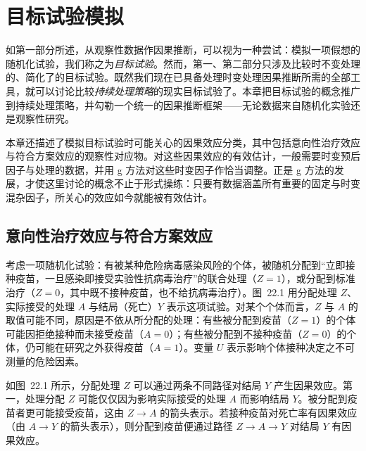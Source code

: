 \chapter{目标试验模拟}

如第一部分所述，从观察性数据作因果推断，可以视为一种尝试：模拟一项假想的随机化试验，我们称之为\emph{目标试验}。然而，第一、第二部分只涉及比较时不变处理的、简化了的目标试验。既然我们现在已具备处理时变处理因果推断所需的全部工具，就可以讨论比较\emph{持续处理策略}的现实目标试验了。本章把目标试验的概念推广到持续处理策略，并勾勒一个统一的因果推断框架——无论数据来自随机化实验还是观察性研究。

本章还描述了模拟目标试验时可能关心的因果效应分类，其中包括意向性治疗效应与符合方案效应的观察性对应物。对这些因果效应的有效估计，一般需要时变预后因子与处理的数据，并用 g 方法对这些时变因子作恰当调整。正是 g 方法的发展，才使这里讨论的概念不止于形式操练：只要有数据涵盖所有重要的固定与时变混杂因子，所关心的效应如今就能被有效估计。

\section{意向性治疗效应与符合方案效应}

考虑一项随机化试验：有被某种危险病毒感染风险的个体，被随机分配到“立即接种疫苗，一旦感染即接受实验性抗病毒治疗”的联合处理（$Z=1$），或分配到标准治疗（$Z=0$，其中既不接种疫苗，也不给抗病毒治疗）。图~22.1 用分配处理 $Z$、实际接受的处理 $A$ 与结局（死亡）$Y$ 表示这项试验。对某个个体而言，$Z$ 与 $A$ 的取值可能不同，原因是不依从所分配的处理：有些被分配到疫苗（$Z=1$）的个体可能因拒绝接种而未接受疫苗（$A=0$）；有些被分配到不接种疫苗（$Z=0$）的个体，仍可能在研究之外获得疫苗（$A=1$）。变量 $U$ 表示影响个体接种决定之不可测量的危险因素。

\begin{figure}[htbp]
\centering
{}
\caption{}
\label{fig:22.1}
\end{figure}

如图~22.1 所示，分配处理 $Z$ 可以通过两条不同路径对结局 $Y$ 产生因果效应。第一，处理分配 $Z$ 可能仅仅因为影响实际接受的处理 $A$ 而影响结局 $Y$。被分配到疫苗者更可能接受疫苗，这由 $Z\to A$ 的箭头表示。若接种疫苗对死亡率有因果效应（由 $A\to Y$ 的箭头表示），则分配到疫苗便通过路径 $Z\to A\to Y$ 对结局 $Y$ 有因果效应。

